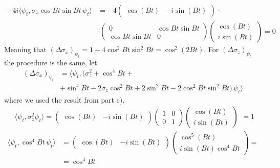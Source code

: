 \documentclass{article}
\begin{document}
\[
\begin{split}
     -4i\langle \psi_t, \sigma_x \cos{Bt} \sin{Bt} \, \psi_t \rangle &= -4 \begin{pmatrix}
            \cos{(Bt)} & -i \sin{(Bt)}
        \end{pmatrix}\cdot\\
        &\cdot\begin{pmatrix}
            0 & \cos{Bt}\sin{Bt}\\
            \cos{Bt}\sin{Bt} & 0
        \end{pmatrix}
        \begin{pmatrix}
            \cos{(Bt)}\\ 
            i \sin{(Bt)}
        \end{pmatrix} = 0
\end{split}
\]
Meaning that $(\Delta \sigma_x)_{\psi_t} = 1-4\cos^2{Bt}\sin^2{Bt} = \cos^2(2Bt)$. For $(\Delta \sigma_z)_{\psi_t}$ the procedure is the same, let
\[ 
    \begin{split}
        (\Delta \sigma_x)_{\psi_t} &= \langle \psi_t, (\sigma_z^2 + \cos^4{Bt} +\\
        &+ \sin^4{Bt} - 2\sigma_z \cos^2{Bt} +2 \sin^2{Bt} -2\cos^2{Bt}\sin^2{Bt})\, \psi_t \rangle
    \end{split}
\]
where we used the result from part c).
\[
    \begin{split}
        \langle \psi_t, \sigma_z^2 \psi_t \rangle = \begin{pmatrix}
            \cos{(Bt)} & -i \sin{(Bt)}
        \end{pmatrix}
        \begin{pmatrix}
            1 & 0\\
            0 & 1
        \end{pmatrix}
        \begin{pmatrix}
            \cos{(Bt)}\\ 
            i \sin{(Bt)}
        \end{pmatrix}
    \end{split} = 1
\]
\[
    \begin{split}
        \langle \psi_t, \cos^4{Bt}\, \psi_t \rangle &= \begin{pmatrix}
            \cos{(Bt)} & -i \sin{(Bt)}
        \end{pmatrix}
        \begin{pmatrix}
            \cos^5{(Bt)}\\ 
            i \sin{(Bt)} \cos^4{Bt}
        \end{pmatrix} =\\
        &= \cos^4{Bt}
    \end{split} 
\]
\end{document}
